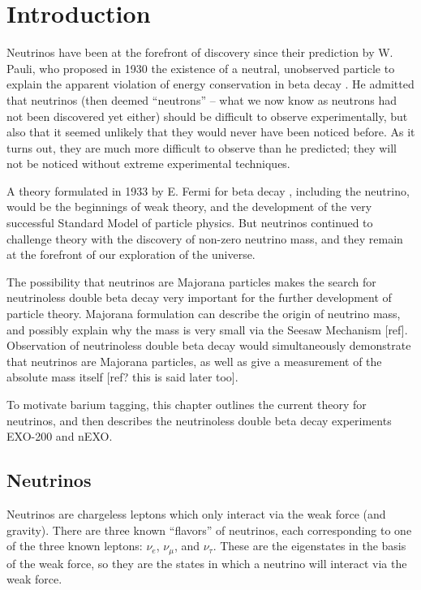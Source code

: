 \chapter{Introduction}

Neutrinos have been at the forefront of discovery since their prediction by W. Pauli, who proposed in 1930 the existence of a neutral, unobserved particle to explain the apparent violation of energy conservation in beta decay \cite{betaspectrum}. He admitted that neutrinos (then deemed ``neutrons'' -- what we now know as neutrons had not been discovered yet either) should be difficult to observe experimentally, but also that it seemed unlikely that they would never have been noticed before.  As it turns out, they are much more difficult to observe than he predicted; they will not be noticed without extreme experimental techniques.

A theory formulated in 1933 by E. Fermi for beta decay \cite{FermiBetaDecay}, including the neutrino, would be the beginnings of weak theory, and the development of the very successful Standard Model of particle physics.  But neutrinos continued to challenge theory with the discovery of non-zero neutrino mass, and they remain at the forefront of our exploration of the universe.

The possibility that neutrinos are Majorana particles makes the search for neutrinoless double beta decay very important for the further development of particle theory.  Majorana formulation can describe the origin of neutrino mass, and possibly explain why the mass is very small via the Seesaw Mechanism [ref].  Observation of neutrinoless double beta decay would simultaneously demonstrate that neutrinos are Majorana particles, as well as give a measurement of the absolute mass itself [ref? this is said later too].

To motivate barium tagging, this chapter outlines the current theory for neutrinos, and then describes the neutrinoless double beta decay experiments EXO-200 and nEXO.

\section{Neutrinos}

Neutrinos are chargeless leptons which only interact via the weak force (and gravity).  There are three known ``flavors'' of neutrinos, each corresponding to one of the three known leptons:  $\nu_{e}$, $\nu_{\mu}$, and $\nu_{\tau}$.  These are the eigenstates in the basis of the weak force, so they are the states in which a neutrino will interact via the weak force.


